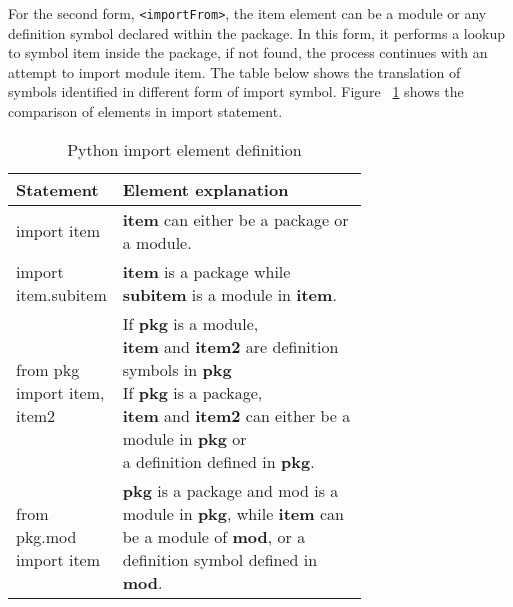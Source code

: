 For the second form, \texttt{<importFrom>}, the item element can be a module or any definition symbol declared within the package. In this form, it performs a lookup to symbol item inside the package, if not found, the process continues with an attempt to import module item. The table below shows the translation of symbols identified in different form of import symbol. Figure ~\ref{table:python-import-def} shows the comparison of elements in import statement.

\begin{table}[ht]
    \centering
    \begin{tabular}{ |l|p{0.7\linewidth}| }
        \hline
        Statement                         & Element explanation                                                                                                             \\
        \hline
        import item                       & \textbf{item} can either be a package or a module.                                                                              \\
        \hline
        import item.subitem               & \textbf{item} is a package while \textbf{subitem} is a module in \textbf{item}.                                                 \\
        \hline
        from pkg import item, item2       &
        \makecell[l]
        {If \textbf{pkg} is a module,                                                                                                                                       \\ \textbf{item} and \textbf{item2} are definition symbols in \textbf{pkg}                                                            \\
            If \textbf{pkg} is a package,                                                                                                                                   \\ \textbf{item} and \textbf{item2} can either be a module in \textbf{pkg} or \\ a definition defined in \textbf{pkg}.
        }                                                                                                                                                                   \\
        \hline
        from pkg.mod import item & \textbf{pkg} is a package and mod is a module in \textbf{pkg}, while \textbf{item} can be a module of \textbf{mod}, or a definition symbol defined in \textbf{mod}. \\
        \hline
    \end{tabular}
    \caption{Python import element definition}
    \label{table:python-import-def}
\end{table}

